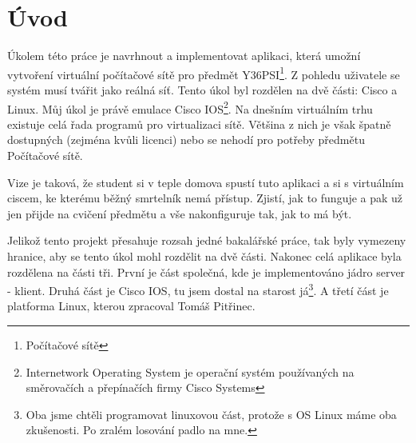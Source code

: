 \chapter{Úvod}


Úkolem této práce je navrhnout a implementovat aplikaci, která umožní vytvoření virtuální počítačové sítě pro předmět Y36PSI\footnote{Počítačové sítě}. Z pohledu uživatele se systém musí tvářit jako reálná síť. Tento úkol byl rozdělen na dvě části: Cisco a Linux. Můj úkol je právě emulace Cisco IOS\footnote{Internetwork Operating System je operační systém používaných na směrovačích a přepínačích firmy Cisco Systems}. Na dnešním virtuálním trhu existuje celá řada programů pro virtualizaci sítě. Většina z nich je však špatně dostupných (zejména kvůli licenci) nebo se nehodí pro potřeby předmětu Počítačové sítě. 

Vize je taková, že student si v teple domova spustí tuto aplikaci a  si s virtuálním ciscem, ke kterému běžný smrtelník nemá přístup. Zjistí, jak to funguje a pak už jen přijde na cvičení předmětu a vše nakonfiguruje tak, jak to má být. 

Jelikož tento projekt přesahuje rozsah jedné bakalářské práce, tak byly vymezeny hranice, aby se tento úkol mohl rozdělit na dvě části. Nakonec celá aplikace byla rozdělena na části tři. První je část společná, kde je implementováno jádro server - klient. Druhá část je Cisco IOS, tu jsem dostal na starost já\footnote{Oba jsme chtěli programovat linuxovou část, protože s OS Linux máme oba zkušenosti. Po zralém losování  padlo na mne.}. A třetí část je platforma Linux, kterou zpracoval Tomáš Pitřinec.



